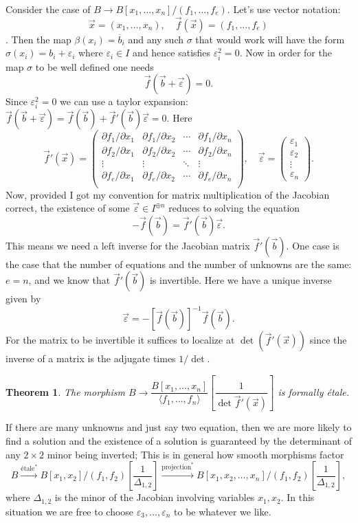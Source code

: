 \documentclass[12pt]{article}
\numberwithin{equation}{section}
\newtheorem{theorem}{Theorem}[subsection]
\theoremstyle{definition}
\theoremstyle{remark}
\begin{document}
Consider the case of $B \to B[x_1,\ldots,x_n]/(f_1,\ldots,f_e)$. 
Let's use vector notation: 
$$\vec{x} = (x_1,\ldots,x_n), \quad \vec{f}(\vec{x}) = (f_1,\ldots,f_e)$$. 
Then the map $\beta(x_i) = \overline{b}_i$ and any such $\sigma$ that would work will have the form $\sigma(x_i) = b_i + \varepsilon_i$ where $\varepsilon_i \in I$ and hence satisfies $\varepsilon_i^2=0$. 
Now in order for the map $\sigma$ to be well defined one needs 
$$ \vec{f}(\vec{b}+\vec{\varepsilon})=0.$$
Since $\varepsilon_i^2=0$ we can use a taylor expansion: $\vec{f}(\vec{b}+\vec{\varepsilon})=\vec{f}(\vec{b}) + \vec{f}'(\vec{b})\vec{\varepsilon}=0$. 
Here 
$$\vec{f}'(\vec{x}) = \begin{pmatrix}
\partial f_1/\partial x_1 & \partial f_1/\partial x_2 & \cdots & \partial f_1/\partial x_n \\
\partial f_2/\partial x_1 & \partial f_2/\partial x_2 & \cdots & \partial f_2/\partial x_n \\
\vdots & \vdots &\ddots  & \vdots\\
\partial f_e/\partial x_1 & \partial f_e/\partial x_2 & \cdots & \partial f_e/\partial x_n \\
\end{pmatrix}, \quad \vec{\varepsilon} = \begin{pmatrix} \varepsilon_1 \\
\varepsilon_2 \\
\vdots \\
\varepsilon_n
\end{pmatrix}.
$$
Now, provided I got my convention for matrix multiplication of the Jacobian correct, the existence of some $\vec{\varepsilon} \in I^{\oplus n}$ reduces to solving the equation 
\begin{equation}
-\vec{f}(\vec{b}) =\vec{f}'(\vec{b})\vec{\varepsilon}.
\end{equation}
This means we need a left inverse for the Jacobian matrix $\vec{f}'(\vec{b})$. 
One case is the case that the number of equations and the number of unknowns are the same: $e=n$, and we know that $\vec{f}'(\vec{b})$ is invertible. 
Here we have a unique inverse given by 
$$ \vec{\varepsilon} = -[\vec{f}(\vec{b})]^{-1} \vec{f}(\vec{b}). $$
For the matrix to be invertible it suffices to localize at $\det(\vec{f}'(\vec{x}))$ since the inverse of a matrix is the adjugate times $1/\det$.
\begin{theorem}
	The morphism $B \to \dfrac{B[x_1,\ldots,x_n]}{\langle f_1,\ldots,f_n\rangle}\left [\dfrac{1}{\det{\vec{f}'(\vec{x})}}\right ]$ is formally \'etale. 
\end{theorem}
If there are many unknowns and just say two equation, then we are more likely to find a solution and the existence of a solution is guaranteed by the determinant of any $2\times 2$ minor being inverted; This is in general how smooth morphisms factor 
$$ B \xrightarrow{\mbox{\'etale}^*} B[x_1,x_2]/(f_1,f_2)\left[ \frac{1}{\Delta_{1,2}}\right] \xrightarrow{\mbox{projection}^*} B[x_1,x_2,\ldots,x_n]/(f_1,f_2) \left[ \frac{1}{\Delta_{1,2}}\right],$$
where $\Delta_{1,2}$ is the minor of the Jacobian involving variables $x_1,x_2$. 
In this situation we are free to choose $\varepsilon_3,\ldots,\varepsilon_n$ to be whatever we like.
\end{document}
